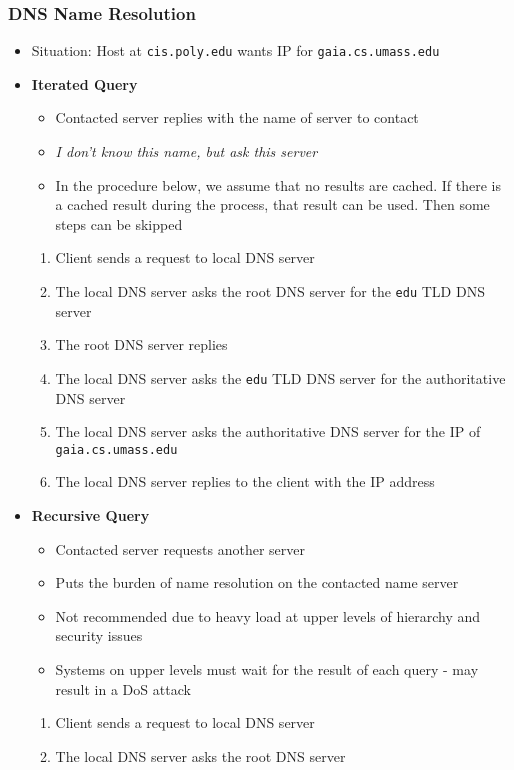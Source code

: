 \subsubsection{DNS Name Resolution}
\begin{itemize}
	\item Situation: Host at \texttt{cis.poly.edu} wants IP for \texttt{gaia.cs.umass.edu}
	\item \textbf{Iterated Query}
	\begin{itemize}
		\item Contacted server replies with the name of server to contact
		\item \textit{I don't know this name, but ask this server}
		\item In the procedure below, we assume that no results are cached. If there is a cached result during the process, that result can be used. Then some steps can be skipped
	\end{itemize}
	\begin{enumerate}
		\item Client sends a request to local DNS server
		\item The local DNS server asks the root DNS server for the \texttt{edu} TLD DNS server
		\item The root DNS server replies
		\item The local DNS server asks the \texttt{edu} TLD DNS server for the authoritative DNS server
		\item The local DNS server asks the authoritative DNS server for the IP of \texttt{gaia.cs.umass.edu}
		\item The local DNS server replies to the client with the IP address
	\end{enumerate}
	\item \textbf{Recursive Query}
	\begin{itemize}
		\item Contacted server requests another server
		\item Puts the burden of name resolution on the contacted name server
		\item Not recommended due to heavy load at upper levels of hierarchy and security issues
		\item Systems on upper levels must wait for the result of each query - may result in a DoS attack
	\end{itemize}
	\begin{enumerate}
		\item Client sends a request to local DNS server
		\item The local DNS server asks the root DNS server

\end{enumerate}
\end{itemize}
